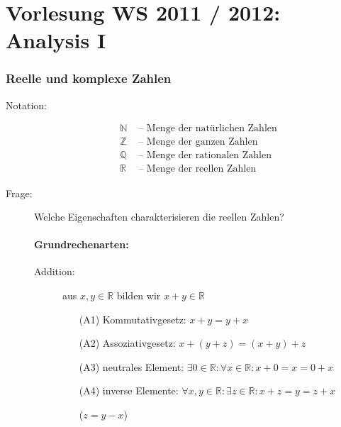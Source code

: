 \documentclass[12pt,a4paper,leqno]{article}
\author{Martin Dreher}
\begin{document}
  \part*{Vorlesung WS 2011 / 2012: Analysis I}
  
  \section{Reelle und komplexe Zahlen}
  
  \begin{description}
    \item[Notation:]
      \begin{align*}
        \mathbb{N} &\textrm{ -- Menge der natürlichen Zahlen}\\
        \mathbb{Z} &\textrm{ -- Menge der ganzen Zahlen}\\
        \mathbb{Q} &\textrm{ -- Menge der rationalen Zahlen}\\
        \mathbb{R} &\textrm{ -- Menge der reellen Zahlen}
      \end{align*}
      
    \item[Frage:] Welche Eigenschaften charakterisieren die reellen Zahlen?
      \subsection*{Grundrechenarten:} 
      \begin{description}
        \item[Addition:] aus $x, y \in \mathbb{R}$ bilden wir $x+y\in \mathbb{R}$
          \begin{itemize}
            \item[(A1)] Kommutativgesetz: $x + y = y + x$
            \item[(A2)] Assoziativgesetz: $x + (y + z) = (x + y) + z$
            \item[(A3)] neutrales Element: $\exists 0 \in \mathbb{R} : \forall x \in \mathbb{R} : x + 0 = x = 0 + x$
            \item[(A4)] inverse Elemente: $\forall x, y \in \mathbb{R} : \exists z \in \mathbb{R} : x + z = y = z + x$ \begin{flushright}
                ($z = y - x$)
              \end{flushright}
          \end{itemize}
          

\end{description}
\end{description}
\end{document}
